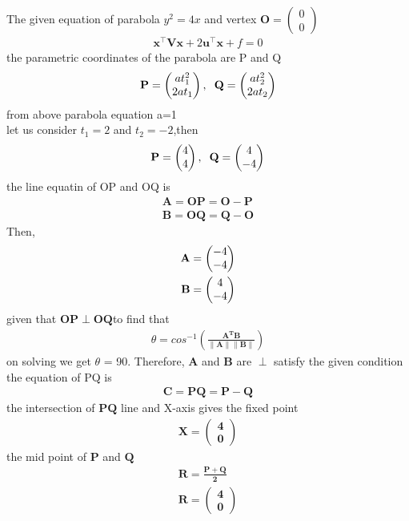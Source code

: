\documentclass[journal,10pt,twocolumn]{article}
\let\vec\mathbf
\newcommand{\myvec}[1]{\ensuremath{\begin{pmatrix}#1\end{pmatrix}}}
\begin{document}
The given equation of parabola $y^2 = 4x$ and vertex $\vec{O}=\myvec{0\\0}$
\begin{align}
    \label{eq:conic_quad_form}
    \vec{x}^{\top}\vec{V}\vec{x}+2\vec{u}^{\top}\vec{x}+f=0
    \end{align}
the parametric coordinates of the parabola are P and Q 
\begin{equation*}
 \vec{P} = \myvec{at_1^2\\2at_1} ,\hspace{2mm}\vec{Q} = \myvec{at_2^2\\2at_2}
\end{equation*}
from above parabola equation a=1\\
let us consider $t_1=2 $ and $t_2=-2$,then
\begin{align*}
\vec{P = \myvec{4\\4} ,\hspace{2mm} Q = \myvec{4\\-4}}
\end{align*}
the line equatin of OP and OQ is 
\begin{align*}
\vec{A = OP = O-P}\\
\vec{B = OQ = Q-O}
\end{align*}
Then,
\begin{align*}
\vec{A} = \myvec{-4\\-4}\\
\vspace{1mm}
\vec{B} = \myvec{4\\-4}
\end{align*}
given that $\vec{OP \perp OQ}$to find that 
\begin{align*}
\theta =cos^{-1}\vec{(\frac{A^TB}{\|A\|\|B\|})}
\end{align*}
on solving we get $\theta$ = 90. 
Therefore, $ \vec{A}$ and $\vec{B} $ are $\perp $ satisfy the given condition\\
the equation of PQ is 
\begin{align*}
 \vec{C = PQ = P-Q}
\end{align*}
the intersection of $\vec{PQ}$ line and X-axis gives the fixed point 
\begin{align*}
\vec{X = \myvec{4\\0}}
\end{align*}
the mid point of $\vec{P}$ and $\vec{Q}$ 
\begin{align*}
\vec{R = \frac{P+Q}{2}}\\
\vec{R = \myvec{4\\0}}
\end{align*}
\end{document}
